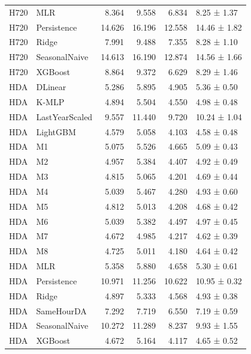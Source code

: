 \begin{tabular}{llrrrl}
H720 & MLR & 8.364 & 9.558 & 6.834 & 8.25 ± 1.37 \\
H720 & Persistence & 14.626 & 16.196 & 12.558 & 14.46 ± 1.82 \\
H720 & Ridge & 7.991 & 9.488 & 7.355 & 8.28 ± 1.10 \\
H720 & SeasonalNaive & 14.613 & 16.190 & 12.874 & 14.56 ± 1.66 \\
H720 & XGBoost & 8.864 & 9.372 & 6.629 & 8.29 ± 1.46 \\
HDA & DLinear & 5.286 & 5.895 & 4.905 & 5.36 ± 0.50 \\
HDA & K-MLP & 4.894 & 5.504 & 4.550 & 4.98 ± 0.48 \\
HDA & LastYearScaled & 9.557 & 11.440 & 9.720 & 10.24 ± 1.04 \\
HDA & LightGBM & 4.579 & 5.058 & 4.103 & 4.58 ± 0.48 \\
HDA & M1 & 5.075 & 5.526 & 4.665 & 5.09 ± 0.43 \\
HDA & M2 & 4.957 & 5.384 & 4.407 & 4.92 ± 0.49 \\
HDA & M3 & 4.815 & 5.065 & 4.201 & 4.69 ± 0.44 \\
HDA & M4 & 5.039 & 5.467 & 4.280 & 4.93 ± 0.60 \\
HDA & M5 & 4.812 & 5.013 & 4.208 & 4.68 ± 0.42 \\
HDA & M6 & 5.039 & 5.382 & 4.497 & 4.97 ± 0.45 \\
HDA & M7 & 4.672 & 4.985 & 4.217 & 4.62 ± 0.39 \\
HDA & M8 & 4.725 & 5.011 & 4.180 & 4.64 ± 0.42 \\
HDA & MLR & 5.358 & 5.880 & 4.658 & 5.30 ± 0.61 \\
HDA & Persistence & 10.971 & 11.256 & 10.622 & 10.95 ± 0.32 \\
HDA & Ridge & 4.897 & 5.333 & 4.568 & 4.93 ± 0.38 \\
HDA & SameHourDA & 7.292 & 7.719 & 6.550 & 7.19 ± 0.59 \\
HDA & SeasonalNaive & 10.272 & 11.289 & 8.237 & 9.93 ± 1.55 \\
HDA & XGBoost & 4.672 & 5.164 & 4.117 & 4.65 ± 0.52 \\
\bottomrule
\end{tabular}
